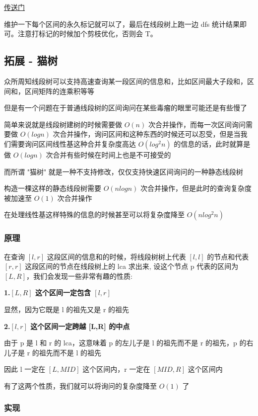 \href{http://acm.hdu.edu.cn/showproblem.php?pid=6356}{传送门}

维护一下每个区间的永久标记就可以了，最后在线段树上跑一边 dfs 统计结果即可。注意打标记的时候加个剪枝优化，否则会 T。

\subsection{拓展 - 猫树}

众所周知线段树可以支持高速查询某一段区间的信息和，比如区间最大子段和，区间和，区间矩阵的连乘积等等

但是有一个问题在于普通线段树的区间询问在某些毒瘤的眼里可能还是有些慢了

简单来说就是线段树建树的时候需要做 $O(n)$ 次合并操作，而每一次区间询问需要做 $O(logn)$ 次合并操作，询问区间和这种东西的时候还可以忍受，但是当我们需要询问区间线性基这种合并复杂度高达 $O(log^2n)$ 的信息的话，此时就算是做 $O(logn)$ 次合并有些时候在时间上也是不可接受的

而所谓 "猫树" 就是一种不支持修改，仅仅支持快速区间询问的一种静态线段树

构造一棵这样的静态线段树需要 $O(nlogn)$ 次合并操作，但是此时的查询复杂度被加速至 $O(1)$ 次合并操作

在处理线性基这样特殊的信息的时候甚至可以将复杂度降至 $O(nlog^2n)$

\subsubsection{原理}

在查询 $[l,r]$ 这段区间的信息和的时候，将线段树树上代表 $[l,l]$ 的节点和代表 $[r,r]$ 这段区间的节点在线段树上的 lca 求出来, 设这个节点 p 代表的区间为 $[L,R]$，我们会发现一些非常有趣的性质:

\textbf{1.$[L,R]$ 这个区间一定包含 $[l,r]$}

显然，因为它既是 l 的祖先又是 r 的祖先

\textbf{2.$[l,r]$ 这个区间一定跨越 [L,R] 的中点 }

由于 p 是 l 和 r 的 lca，这意味着 p 的左儿子是 l 的祖先而不是 r 的祖先，p 的右儿子是 r 的祖先而不是 l 的祖先

因此 l 一定在 $[L,MID]$ 这个区间内，r 一定在 $[MID,R]$ 这个区间内

有了这两个性质，我们就可以将询问的复杂度降至 $O(1)$ 了

\subsubsection{实现}

